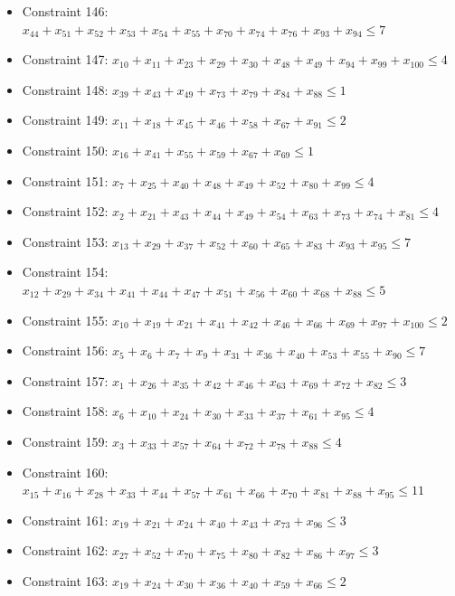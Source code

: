 \documentclass[11pt]{article}
\begin{document}
\begin{itemize}
\item Constraint 146: $x_{44} + x_{51} + x_{52} + x_{53} + x_{54} + x_{55} + x_{70} + x_{74} + x_{76} + x_{93} + x_{94} \le 7$
\item Constraint 147: $x_{10} + x_{11} + x_{23} + x_{29} + x_{30} + x_{48} + x_{49} + x_{94} + x_{99} + x_{100} \le 4$
\item Constraint 148: $x_{39} + x_{43} + x_{49} + x_{73} + x_{79} + x_{84} + x_{88} \le 1$
\item Constraint 149: $x_{11} + x_{18} + x_{45} + x_{46} + x_{58} + x_{67} + x_{91} \le 2$
\item Constraint 150: $x_{16} + x_{41} + x_{55} + x_{59} + x_{67} + x_{69} \le 1$
\item Constraint 151: $x_{7} + x_{25} + x_{40} + x_{48} + x_{49} + x_{52} + x_{80} + x_{99} \le 4$
\item Constraint 152: $x_{2} + x_{21} + x_{43} + x_{44} + x_{49} + x_{54} + x_{63} + x_{73} + x_{74} + x_{81} \le 4$
\item Constraint 153: $x_{13} + x_{29} + x_{37} + x_{52} + x_{60} + x_{65} + x_{83} + x_{93} + x_{95} \le 7$
\item Constraint 154: $x_{12} + x_{29} + x_{34} + x_{41} + x_{44} + x_{47} + x_{51} + x_{56} + x_{60} + x_{68} + x_{88} \le 5$
\item Constraint 155: $x_{10} + x_{19} + x_{21} + x_{41} + x_{42} + x_{46} + x_{66} + x_{69} + x_{97} + x_{100} \le 2$
\item Constraint 156: $x_{5} + x_{6} + x_{7} + x_{9} + x_{31} + x_{36} + x_{40} + x_{53} + x_{55} + x_{90} \le 7$
\item Constraint 157: $x_{1} + x_{26} + x_{35} + x_{42} + x_{46} + x_{63} + x_{69} + x_{72} + x_{82} \le 3$
\item Constraint 158: $x_{6} + x_{10} + x_{24} + x_{30} + x_{33} + x_{37} + x_{61} + x_{95} \le 4$
\item Constraint 159: $x_{3} + x_{33} + x_{57} + x_{64} + x_{72} + x_{78} + x_{88} \le 4$
\item Constraint 160: $x_{15} + x_{16} + x_{28} + x_{33} + x_{44} + x_{57} + x_{61} + x_{66} + x_{70} + x_{81} + x_{88} + x_{95} \le 11$
\item Constraint 161: $x_{19} + x_{21} + x_{24} + x_{40} + x_{43} + x_{73} + x_{96} \le 3$
\item Constraint 162: $x_{27} + x_{52} + x_{70} + x_{75} + x_{80} + x_{82} + x_{86} + x_{97} \le 3$
\item Constraint 163: $x_{19} + x_{24} + x_{30} + x_{36} + x_{40} + x_{59} + x_{66} \le 2$

\end{itemize}
\end{document}
